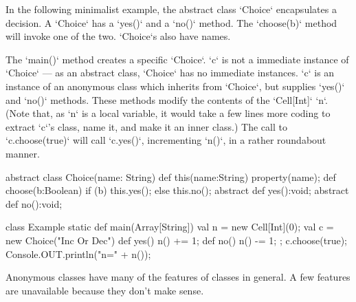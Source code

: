 \begin{ex}In the following minimalist example, the abstract class \xcd`Choice`
encapsulates a decision.   A \xcd`Choice` has a \xcd`yes()` and a \xcd`no()`
method.  The \xcd`choose(b)` method will invoke one of the two.  \xcd`Choice`s
also have names.

The \xcd`main()` method creates a specific \xcd`Choice`.  \xcd`c` is not a
immediate instance of \xcd`Choice` --- as an abstract class, \xcd`Choice` has
no immediate instances. \xcd`c` is an instance of an anonymous class which
inherits from \xcd`Choice`, but supplies \xcd`yes()` and \xcd`no()` methods.
These methods modify the contents of the \xcd`Cell[Int]` \xcd`n`.  (Note that,
as \xcd`n` is a local variable, it would take a few lines more coding to
extract \xcd`c`'s class, name it, and make it an inner class.)  The call to
\xcd`c.choose(true)`  will call \xcd`c.yes()`, incrementing \xcd`n()`, in a
rather roundabout manner.

\begin{xten}
abstract class Choice(name: String) {
  def this(name:String) {property(name);}
  def choose(b:Boolean) { 
     if (b) this.yes(); else this.no(); }
  abstract def yes():void;
  abstract def no():void;
}

class Example {
  static def main(Array[String]) {
    val n = new Cell[Int](0);
    val c = new Choice("Inc Or Dec") {
      def yes() { n() += 1; }
      def no()  { n() -= 1; }
      };
    c.choose(true);
    Console.OUT.println("n=" + n());
  }
}

\end{xten}
%
\end{ex}

Anonymous classes have many of the features of classes in general.  A few
features are unavailable because they don't make sense.

